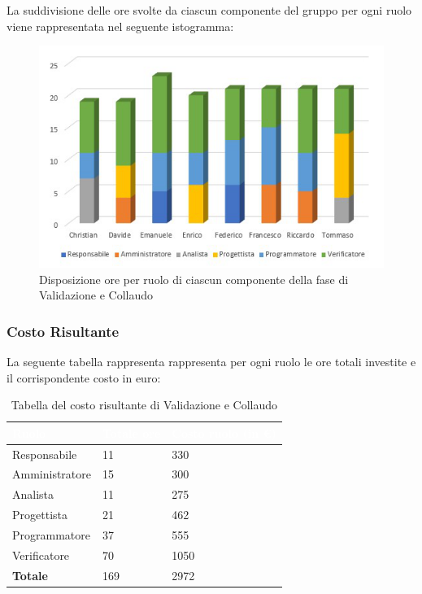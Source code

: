 La suddivisione delle ore svolte da ciascun componente del gruppo per ogni ruolo viene rappresentata nel seguente istogramma:
\begin{figure}[h!]
	\centering
	\includegraphics{Sezioni/Istogrammi/IstogrammaValidazione.png}
	\caption{Disposizione ore per ruolo di ciascun componente della fase di Validazione e Collaudo}
\end{figure}

\clearpage

\subsubsection{Costo Risultante}
La seguente tabella rappresenta rappresenta per ogni ruolo le ore totali investite e il corrispondente costo in euro:
{
\renewcommand{\arraystretch}{2}
\begin{longtable}{ C{3cm} C{2cm} C{4cm}}
\caption{Tabella del costo risultante di Validazione e Collaudo}\\

\textcolor{white}{\textbf{Ruolo}} & 
\textcolor{white}{\textbf{Totale ore}} & 
\textcolor{white}{\textbf{Costo ruolo (in \euro{})}}\\	
\endhead
        
Responsabile    &  11 &  330 \\
Amministratore  &  15 &  300 \\
Analista        &  11 &  275 \\
Progettista     &  21 &  462 \\
Programmatore   &  37 &  555 \\
Verificatore    &  70 & 1050 \\
\textbf{Totale} & 169 & 2972 \\
	
\end{longtable}
}

